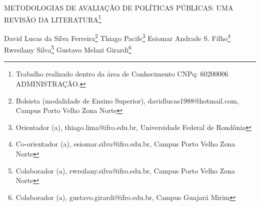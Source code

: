 \documentclass[article,12pt,onesidea,4paper,english,brazil]{abntex2}
\begin{document}
	
	
	\frenchspacing 
	
	\begin{center}
		\LARGE METODOLOGIAS DE AVALIAÇÃO DE POLÍTICAS PÚBLICAS: UMA REVISÃO
		DA LITERATURA\footnote{Trabalho realizado dentro da área de Conhecimento CNPq: 60200006 ADMINISTRAÇÃO.}
		
		\normalsize
		David Lucas da Silva Ferreira\footnote{Bolsista (modalidade de Ensino Superior), davidlucas1988@hotmail.com, Campus Porto Velho Zona
			Norte} 
		Thiago Pacife\footnote{Orientador (a), thiago.lima@ifro.edu.br, Universidade Federal de Rondônia} 
		Esiomar Andrade S. Filho\footnote{Co-orientador (a), esiomar.silva@ifro.edu.br, Campus Porto Velho Zona Norte} \\
		Rwrsilany Silva\footnote{Colaborador (a), rwrsilany.silva@ifro.edu.br, Campus Porto Velho Zona Norte}
		Gustavo Melazi Girardi\footnote{Colaborador (a), gustavo.girardi@ifro.edu.br, Campus Guajará Mirim} 
	\end{center}
	
\end{document}
